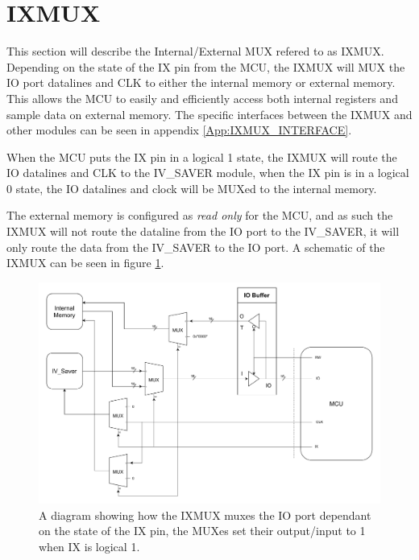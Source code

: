 \section{IXMUX} \label{subsec:IXMUX}
This section will describe the Internal/External MUX refered to as IXMUX. Depending on the state of the IX pin from the MCU, the IXMUX
will MUX the IO port datalines and CLK to either the internal memory or external memory. This allows the MCU to easily and efficiently
 access both internal registers and sample data on external memory. The specific interfaces between the IXMUX and other modules can be
 seen in appendix \ref{App:IXMUX_INTERFACE}.

When the MCU puts the IX pin in a logical 1 state, the IXMUX will route the IO datalines and CLK to the IV\_SAVER
module, when the IX pin is in a logical 0 state, the IO datalines and clock will be MUXed to the internal memory. 

The external memory is configured as \textit{read only} for the MCU, and as such the IXMUX will not route the dataline from the IO port to the IV\_SAVER, it will only route the data from the IV\_SAVER to the IO port. A schematic of the IXMUX can be seen in figure \ref{fig_7_2_1.5_IXMUX_schematic}.

\begin{figure}[H]
    \centering
    \includegraphics[clip, trim=0 0 0 0, width=1\textwidth]{Sections/7_SystemDesign/Figures/IXMUX_Functionality.pdf}
    \caption{A diagram showing how the IXMUX muxes the IO port dependant on the state of the IX pin, the MUXes set their output/input to 1 when IX is logical 1.}
    \label{fig_7_2_1.5_IXMUX_schematic}
\end{figure}

